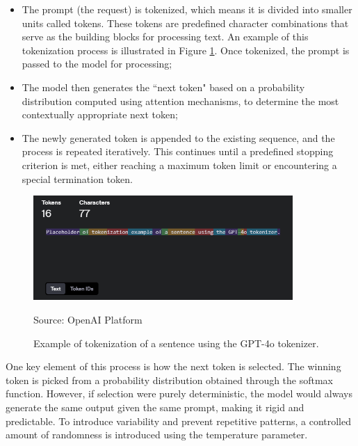 \begin{itemize}
  \item The prompt (the request) is tokenized, which means it is divided into
    smaller units called tokens. These tokens are predefined character combinations
    that serve as the building blocks for processing text. An example of this
    tokenization process is illustrated in Figure \ref{fig:tokenization_example}.
    Once tokenized, the prompt is passed to the model for processing;

  \item The model then generates the ``next token" based on a probability
    distribution computed using attention mechanisms, to determine the most contextually
    appropriate next token;

  \item The newly generated token is appended to the existing sequence, and the
    process is repeated iteratively. This continues until a predefined stopping criterion
    is met, either reaching a maximum token limit or encountering a special
    termination token.
\end{itemize}

\begin{figure}[h!]
  \centering
  \includegraphics[width=0.88\textwidth]{images/tokenization_example.png}
  \caption{Example of tokenization of a sentence using the GPT-4o tokenizer.}
  { Source: OpenAI Platform\footnotemark} \label{fig:tokenization_example}
\end{figure}

One key element of this process is how the next token is selected. The winning
token is picked from a probability distribution obtained through the softmax
function. However, if selection were purely deterministic, the model would always
generate the same output given the same prompt, making it rigid and predictable.
To introduce variability and prevent repetitive patterns, a controlled amount of
randomness is introduced using the temperature parameter.

